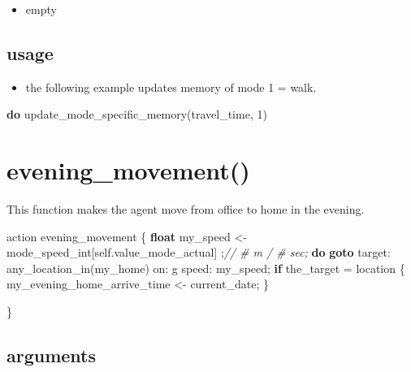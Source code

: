 \documentclass[]{book}
\newenvironment{Shaded}{\begin{snugshade}}{\end{snugshade}}
\newcommand{\CommentTok}[1]{\textcolor[rgb]{0.56,0.35,0.01}{\textit{#1}}}
\newcommand{\DecValTok}[1]{\textcolor[rgb]{0.00,0.00,0.81}{#1}}
\newcommand{\KeywordTok}[1]{\textcolor[rgb]{0.13,0.29,0.53}{\textbf{#1}}}
\newcommand{\NormalTok}[1]{#1}
\newcommand{\OtherTok}[1]{\textcolor[rgb]{0.56,0.35,0.01}{#1}}
\providecommand{\tightlist}{%
  \setlength{\itemsep}{0pt}\setlength{\parskip}{0pt}}
\theoremstyle{definition}
\theoremstyle{definition}
\theoremstyle{definition}
\theoremstyle{remark}
\begin{document}
\begin{itemize}
\tightlist
\item
  empty
\end{itemize}

\hypertarget{usage}{%
\subsection*{usage}\label{usage}}

\begin{itemize}
\tightlist
\item
  the following example updates memory of mode 1 = walk.
\end{itemize}

\begin{Shaded}
\begin{Highlighting}[]
\KeywordTok{do}\NormalTok{ update_mode_specific_memory}\OtherTok{(}\NormalTok{travel_time}\OtherTok{,} \DecValTok{1}\OtherTok{)}
\end{Highlighting}
\end{Shaded}

\hypertarget{evening_movement}{%
\section{evening\_movement()}\label{evening_movement}}

This function makes the agent move from office to home in the evening.

\begin{Shaded}
\begin{Highlighting}[]
\NormalTok{action evening_movement}
\NormalTok{    \{}
        \KeywordTok{float}\NormalTok{ my_speed <- mode_speed_int}\OtherTok{[}\NormalTok{self.value_mode_actual}\OtherTok{]} \OtherTok{;}\CommentTok{// # m / # sec;}
        \KeywordTok{do} \KeywordTok{goto}\NormalTok{ target: any_location_in}\OtherTok{(}\NormalTok{my_home}\OtherTok{)}\NormalTok{ on: g speed: my_speed}\OtherTok{;}
        \KeywordTok{if}\NormalTok{ the_target = location}
\NormalTok{        \{}
\NormalTok{            my_evening_home_arrive_time <- current_date}\OtherTok{;}
\NormalTok{        \}}

\NormalTok{    \}}
\end{Highlighting}
\end{Shaded}

\hypertarget{arguments-1}{%
\subsection*{arguments}\label{arguments-1}}
\end{document}
